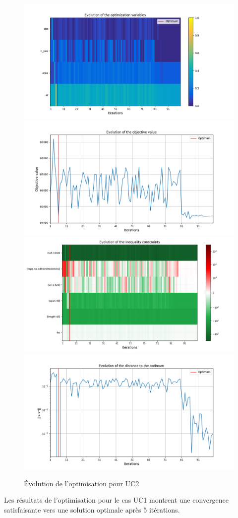 \documentclass[a4paper, 11pt]{article}
\begin{document}
\begin{figure}[H]
    \centering
    \includegraphics[width=0.49\linewidth]{Images_case_2/p1u2_evol_optim_variables2.png}
    \includegraphics[width=0.49\linewidth]{Images_case_2/p1u2_evol_obj_val2.png}
    \includegraphics[width=0.49\linewidth]{Images_case_2/p1u2_evol_ineq_const2.png}
    \includegraphics[width=0.49\linewidth]{Images_case_2/p1u2_evol_dist_to_opt2.png}
    \caption{Évolution de l'optimisation pour UC2}
    \label{fig:pu1u2optim}
\end{figure}


Les résultats de l'optimisation pour le cas UC1 montrent une convergence satisfaisante vers une solution optimale après 5 itérations.
\end{document}
